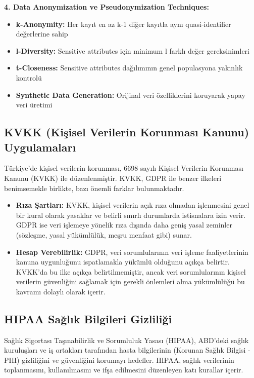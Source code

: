\textbf{4. Data Anonymization ve Pseudonymization Techniques:}
\begin{itemize}
    \item \textbf{k-Anonymity:} Her kayıt en az k-1 diğer kayıtla aynı quasi-identifier değerlerine sahip
    \item \textbf{l-Diversity:} Sensitive attributes için minimum l farklı değer gereksinimleri
    \item \textbf{t-Closeness:} Sensitive attributes dağılımının genel populasyona yakınlık kontrolü
    \item \textbf{Synthetic Data Generation:} Orijinal veri özelliklerini koruyarak yapay veri üretimi
\end{itemize}

\subsection{KVKK (Kişisel Verilerin Korunması Kanunu) Uygulamaları}

Türkiye'de kişisel verilerin korunması, 6698 sayılı Kişisel Verilerin Korunması Kanunu (KVKK) ile düzenlenmiştir. KVKK, GDPR ile benzer ilkeleri benimsemekle birlikte, bazı önemli farklar bulunmaktadır.

\begin{itemize}
    \item \textbf{Rıza Şartları:} KVKK, kişisel verilerin açık rıza olmadan işlenmesini genel bir kural olarak yasaklar ve belirli sınırlı durumlarda istisnalara izin verir. GDPR ise veri işlemeye yönelik rıza dışında daha geniş yasal zeminler (sözleşme, yasal yükümlülük, meşru menfaat gibi) sunar.
    \item \textbf{Hesap Verebilirlik:} GDPR, veri sorumlularının veri işleme faaliyetlerinin kanuna uygunluğunu ispatlamakla yükümlü olduğunu açıkça belirtir. KVKK'da bu ilke açıkça belirtilmemiştir, ancak veri sorumlularının kişisel verilerin güvenliğini sağlamak için gerekli önlemleri alma yükümlülüğü bu kavramı dolaylı olarak içerir.
\end{itemize}

\subsection{HIPAA Sağlık Bilgileri Gizliliği}

Sağlık Sigortası Taşınabilirlik ve Sorumluluk Yasası (HIPAA), ABD'deki sağlık kuruluşları ve iş ortakları tarafından hasta bilgilerinin (Korunan Sağlık Bilgisi - PHI) gizliliğini ve güvenliğini korumayı hedefler. HIPAA, sağlık verilerinin toplanmasını, kullanılmasını ve ifşa edilmesini düzenleyen katı kurallar içerir.

